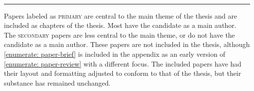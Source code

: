 \vspace{5mm}

\raggedright\par\noindent\hspace{8mm}{\Large\scshape secondary}\\[-2mm]

\raggedleft\rule{\textwidth - 8mm}{0.4pt}

\begin{enumerate}[leftmargin=8mm,topsep=0mm,label={[\Alph*]}]
    \setcounter{enumi}{3}
    \item {} \co
    \item {} \co %
    \item {} \co \label{enumerate: paper-brief}
\end{enumerate}


\justifying

\vspace{5mm}

\noindent Papers labeled as \textsc{primary} are central to the main theme of the thesis and are included as chapters of the thesis. Most have the candidate as a main author. 
The \textsc{secondary} papers are less central to the main theme, or do not have the candidate as a main author. These papers are not included in the thesis, although \ref{enumerate: paper-brief} is included in the appendix as an early version of \ref{enumerate: paper-review} with a different focus. 
%
The included papers have had their layout and formatting adjusted to conform to that of the thesis, but their substance has remained unchanged.

\vspace*{\fill}
